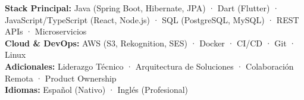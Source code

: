 
\begin{cvparagraph}
\textbf{Stack Principal:} Java (Spring Boot, Hibernate, JPA) · Dart (Flutter) · JavaScript/TypeScript (React, Node.js) · SQL (PostgreSQL, MySQL) · REST APIs · Microservicios
\\
\textbf{Cloud \& DevOps:} AWS (S3, Rekognition, SES) · Docker · CI/CD · Git · Linux
\\
\textbf{Adicionales:} Liderazgo Técnico · Arquitectura de Soluciones · Colaboración Remota · Product Ownership
\\
\textbf{Idiomas:} Español (Nativo) · Inglés (Profesional)
\end{cvparagraph}

